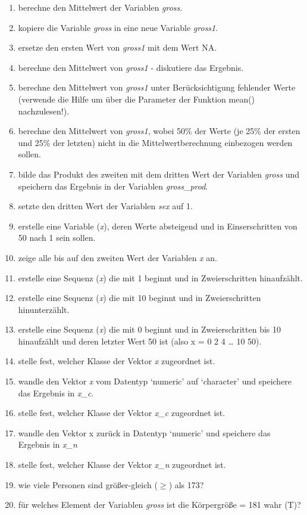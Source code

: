 \documentclass[]{article}
\providecommand{\tightlist}{%
  \setlength{\itemsep}{0pt}\setlength{\parskip}{0pt}}
\begin{document}
\begin{enumerate}
\def\labelenumi{\arabic{enumi}.}
\tightlist
\item
  berechne den Mittelwert der Variablen \emph{gross}.
\item
  kopiere die Variable \emph{gross} in eine neue Variable \emph{gross1}.
\item
  ersetze den ersten Wert von \emph{gross1} mit dem Wert NA.
\item
  berechne den Mittelwert von \emph{gross1} - diskutiere das Ergebnis.
\item
  berechne den Mittelwert von \emph{gross1} unter Berücksichtigung
  fehlender Werte (verwende die Hilfe um über die Parameter der Funktion
  mean() nachzulesen!).
\item
  berechne den Mittelwert von \emph{gross1}, wobei 50\% der Werte (je
  25\% der ersten und 25\% der letzten) nicht in die
  Mittelwertberechnung einbezogen werden sollen.
\item
  bilde das Produkt des zweiten mit dem dritten Wert der Variablen
  \emph{gross} und speichern das Ergebnis in der Variablen
  \emph{gross\_prod}.
\item
  setzte den dritten Wert der Variablen \emph{sex} auf 1.
\item
  erstelle eine Variable (\emph{x}), deren Werte absteigend und in
  Einserschritten von 50 nach 1 sein sollen.
\item
  zeige alle bis auf den zweiten Wert der Variablen \emph{x} an.
\item
  erstelle eine Sequenz (\emph{x}) die mit 1 beginnt und in
  Zweierschritten hinaufzählt.
\item
  erstelle eine Sequenz (\emph{x}) die mit 10 beginnt und in
  Zweierschritten hinunterzählt.
\item
  erstelle eine Sequenz (\emph{x}) die mit 0 beginnt und in
  Zweierschritten bis 10 hinaufzählt und deren letzter Wert 50 ist (also
  x = 0 2 4 \ldots{} 10 50).
\item
  stelle fest, welcher Klasse der Vektor \emph{x} zugeordnet ist.
\item
  wandle den Vektor \emph{x} vom Datentyp `numeric' auf `character' und
  speichere das Ergebnis in \emph{x\_c}.
\item
  stelle fest, welcher Klasse der Vektor \emph{x\_c} zugeordnet ist.
\item
  wandle den Vektor x zurück in Datentyp `numeric' und speichere das
  Ergebnis in \emph{x\_n}
\item
  stelle fest, welcher Klasse der Vektor \emph{x\_n} zugeordnet ist.
\item
  wie viele Personen sind größer-gleich (\(\ge\)) als 173?
\item
  für welches Element der Variablen \emph{gross} ist die Körpergröße =
  181 wahr (T)?
\end{enumerate}
\end{document}
